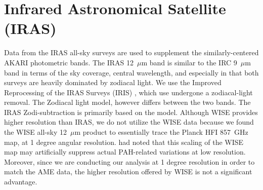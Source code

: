     \section{Infrared Astronomical Satellite (IRAS)}
       Data from the IRAS \citep{iras84} all-sky surveys are used to supplement the similarly-centered AKARI photometric bands. The IRAS 12~$\mu$m band is similar to the IRC 9~$\mu$m band in terms of the sky coverage, central wavelength, and especially in that both surveys are heavily dominated by zodiacal light. We use the Improved Reprocessing of the IRAS Surveys (IRIS) \citep{iris05}, which use undergone a zodiacal-light removal. The Zodiacal light model, however differs between the two bands. The IRAS Zodi-subtraction is primarily based on the \cite{kelsall98} model. Although WISE provides higher resolution than IRAS, we do not utilize the WISE data because we found the WISE all-sky 12~$\mu$m product to essentially trace the Planck HFI 857~GHz map, at 1 degree angular resolution. \cite{hensley16} had noted that this scaling of the WISE map may artificially suppress actual PAH-related variations at low resolution. Moreover, since we are conducting our analysis at 1 degree resolution in order to match the AME data, the higher resolution offered by WISE is not a significant advantage.

